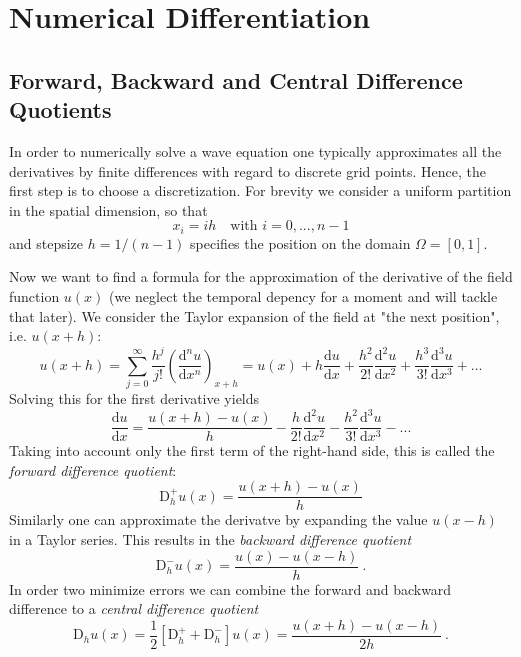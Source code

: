 \section{Numerical Differentiation}
\subsection{Forward, Backward and Central Difference Quotients}
In order to numerically solve a wave equation one typically approximates all the derivatives by finite differences with regard to discrete grid points.
Hence, the first step is to choose a discretization. For brevity we consider a uniform partition in the spatial dimension, so that
\[
x_i = i h  \quad \text{with } i = 0,...,n-1
\]
and stepsize $h = 1/(n-1)$ specifies the position on the domain $\Omega = [0,1] $.

Now we want to find a formula for the approximation of the derivative of the field function $u(x)$ (we neglect the temporal depency for a moment and will tackle that later).
We consider the Taylor expansion of the field at "the next position", i.e. $u(x + h)$:
\begin{equation}
   u(x+h) = \sum_{j = 0}^{\infty} \frac{h^j}{j!} \left(\frac{\mathrm{d}^n u}{\mathrm{d} x^n} \right)_{x+h}
   = u(x) + h \frac{\mathrm{d} u}{\mathrm{d} x} + \frac{h^2}{2!} \frac{\mathrm{d}^2 u}{\mathrm{d} x^2} + \frac{h^3}{3!} \frac{\mathrm{d}^3 u}{\mathrm{d} x^3} + ...
   \label{eq:taylorfw}
 \end{equation}
 Solving this for the first derivative yields
 \begin{equation}
   \frac{\mathrm{d} u}{\mathrm{d} x} = \frac{u(x+h) - u(x)}{h} - \frac{h}{2!} \frac{\mathrm{d}^2 u}{\mathrm{d} x^2} - \frac{h^2}{3!} \frac{\mathrm{d}^3 u}{\mathrm{d} x^3} - ...
 \end{equation}
Taking into account only the first term of the right-hand side, this is called the \emph{forward difference quotient}:
\begin{equation}
  \mathrm{D}^+_h u(x) = \frac{u(x+h) - u(x)}{h}
  \label{eq:discfw}
\end{equation}
Similarly one can approximate the derivatve by expanding the value $u(x-h)$ in a Taylor series. This results in the \emph{backward difference quotient}
\begin{equation}
  \mathrm{D}^-_h u(x) = \frac{u(x) - u(x-h)}{h}~.
\end{equation}
In order two minimize errors we can combine the forward and backward difference to a \emph{central difference quotient}
\begin{equation}
  \mathrm{D}_h u(x)= \frac{1}{2}[\mathrm{D}^+_h+ \mathrm{D}^-_h ] u(x)= \frac{u(x+h) - u(x-h)}{2h}~.
\end{equation}


